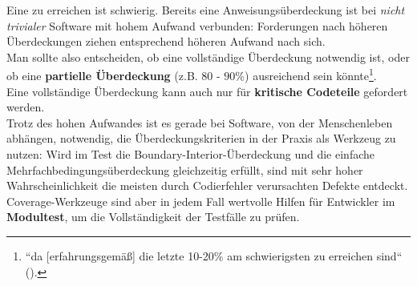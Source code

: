  \noindent
Eine  zu erreichen ist schwierig.
Bereits eine Anweisungsüberdeckung ist bei \textit{nicht trivialer} Software mit hohem Aufwand verbunden: Forderungen nach höheren Überdeckungen ziehen entsprechend höheren Aufwand nach sich.\\
Man sollte also entscheiden, ob eine vollständige Überdeckung notwendig ist, oder ob eine \textbf{partielle Überdeckung} (z.B. $80$ - $90$\%) ausreichend sein könnte\footnote{
``da [erfahrungsgemäß] die letzte 10-20\% am schwierigsten zu erreichen sind`` (\cite[54]{Wed09c}).
}.\\
Eine vollständige Überdeckung kann auch nur für \textbf{kritische Codeteile} gefordert werden.\\

\noindent
Trotz des hohen Aufwandes ist es gerade bei Software, von der Menschenleben abhängen, notwendig, die Überdeckungskriterien in der Praxis als Werkzeug zu nutzen: Wird im Test die Boundary-Interior-Überdeckung und die einfache Mehrfachbedingungsüberdeckung gleichzeitig erfüllt, sind mit sehr hoher Wahrscheinlichkeit die meisten durch Codierfehler verursachten Defekte entdeckt.\\

\noindent
Coverage-Werkzeuge sind aber in jedem Fall wertvolle Hilfen für Entwickler im \textbf{Modultest}, um die Vollständigkeit der Testfälle zu prüfen.